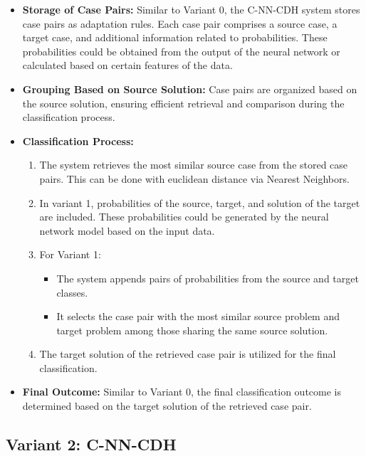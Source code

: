 \documentclass[a4paper, 12pt]{report}
\begin{document}
\begin{itemize}
    \item \textbf{Storage of Case Pairs:} Similar to Variant 0, the C-NN-CDH system stores case pairs as adaptation rules. 
    Each case pair comprises a source case, a target case, and additional information related to probabilities.
    These probabilities could be obtained from the output of the neural network or calculated based on certain features of the data.
    
    \item \textbf{Grouping Based on Source Solution:} Case pairs are organized based on the source solution, 
    ensuring efficient retrieval and comparison during the classification process.
    
    \item \textbf{Classification Process:} 
    \begin{enumerate}
        \item The system retrieves the most similar source case from the stored case pairs. This can be done with euclidean distance via Nearest Neighbors.
        \item In variant 1, probabilities of the source, target, and solution of the target are included.
        These probabilities could be generated by the neural network model based on the input data.
        \item For Variant 1:
            \begin{itemize}
                \item The system appends pairs of probabilities from the source and target classes.
                \item It selects the case pair with the most similar source problem and target problem among those sharing the same source solution.
            \end{itemize}
        \item The target solution of the retrieved case pair is utilized for the final classification.
    \end{enumerate}
    
    \item \textbf{Final Outcome:} Similar to Variant 0, the final classification outcome is determined based on the target solution of the retrieved case pair.
\end{itemize}

\subsection{Variant 2: C-NN-CDH}
\end{document}
